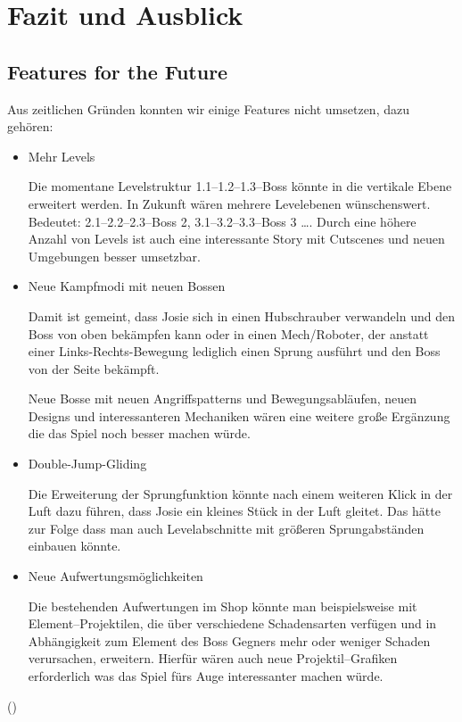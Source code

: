 \chapter{Fazit und Ausblick}

\section{Features for the Future}

Aus zeitlichen Gründen konnten wir einige Features nicht umsetzen, dazu gehören:

\begin{itemize}

\item Mehr Levels

Die momentane Levelstruktur 1.1--1.2--1.3--Boss könnte in die vertikale Ebene erweitert werden. In Zukunft wären mehrere Levelebenen wünschenswert. Bedeutet: 2.1--2.2--2.3--Boss 2,  3.1--3.2--3.3--Boss 3 \dots. Durch eine höhere Anzahl von Levels ist auch eine interessante Story mit Cutscenes und neuen Umgebungen besser umsetzbar. 

\item Neue Kampfmodi mit neuen Bossen

Damit ist gemeint, dass Josie sich in einen Hubschrauber verwandeln und den Boss von oben bekämpfen kann oder in einen Mech/Roboter, der anstatt einer Links-Rechts-Bewegung lediglich einen Sprung ausführt und den Boss von der Seite bekämpft.

Neue Bosse mit neuen Angriffspatterns und Bewegungsabläufen, neuen Designs und interessanteren Mechaniken wären eine weitere große Ergänzung die das Spiel noch besser machen würde.

\item Double-Jump-Gliding

Die Erweiterung der Sprungfunktion könnte nach einem weiteren Klick in der Luft dazu führen, dass Josie ein kleines Stück in der Luft gleitet. Das hätte zur Folge dass man auch Levelabschnitte mit größeren Sprungabständen einbauen könnte.

\item Neue Aufwertungsmöglichkeiten

Die bestehenden Aufwertungen im Shop könnte man beispielsweise mit Element--Projektilen, die über verschiedene Schadensarten verfügen und in Abhängigkeit zum Element des Boss Gegners mehr oder weniger Schaden verursachen, erweitern. Hierfür wären auch neue Projektil--Grafiken erforderlich was das Spiel fürs Auge interessanter machen würde.



\end{itemize}
()